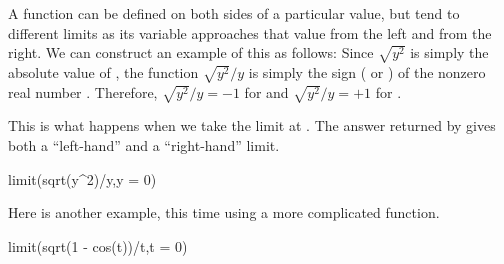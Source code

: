 {{{{{{{{{{{{A function can be defined on both sides of a particular value, but
tend to different limits as its variable approaches that value from the
left and from the right.
We can construct an example of this as follows:
Since
$\sqrt{y^2}$
is simply the absolute value of ,
the function
$\sqrt{y^2} / y$
is simply the sign ( or ) of the nonzero
real number .
Therefore,
$\sqrt{y^2} / y = -1$
for  and
$\sqrt{y^2} / y = +1$
for .
\begin{xtc}
\begin{xtccomment}
This is what happens when we take the limit at .
The answer returned by \Language{} gives both a
``left-hand'' and a ``right-hand'' limit.
\end{xtccomment}
\begin{spadsrc}
limit(sqrt(y^2)/y,y = 0)
\end{spadsrc}
\begin{TeXOutput}
\begin{fricasmath}{4}
%
\end{fricasmath}
\end{TeXOutput}
\end{xtc}
\begin{xtc}
\begin{xtccomment}
Here is another example, this time using a more complicated function.
\end{xtccomment}
\begin{spadsrc}
limit(sqrt(1 - cos(t))/t,t = 0)
\end{spadsrc}
\begin{TeXOutput}
\begin{fricasmath}{5}
%
\end{fricasmath}
\end{TeXOutput}
\end{xtc}

}}}}}}}}}}}}
